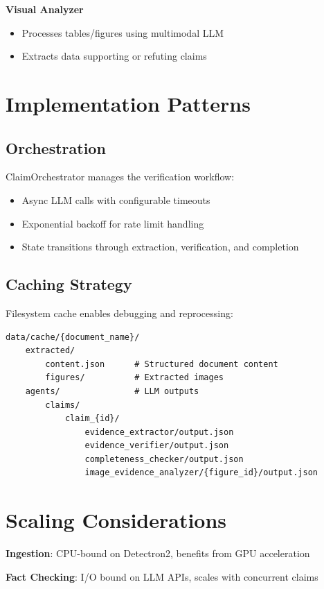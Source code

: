 \documentclass[11pt]{article}
\begin{document}
\textbf{Visual Analyzer}
\begin{itemize}
\item Processes tables/figures using multimodal LLM
\item Extracts data supporting or refuting claims
\end{itemize}

\section{Implementation Patterns}

\subsection{Orchestration}

ClaimOrchestrator manages the verification workflow:
\begin{itemize}
\item Async LLM calls with configurable timeouts
\item Exponential backoff for rate limit handling
\item State transitions through extraction, verification, and completion
\end{itemize}

\subsection{Caching Strategy}

Filesystem cache enables debugging and reprocessing:

\begin{verbatim}
data/cache/{document_name}/
    extracted/
        content.json      # Structured document content
        figures/          # Extracted images
    agents/               # LLM outputs
        claims/
            claim_{id}/
                evidence_extractor/output.json
                evidence_verifier/output.json
                completeness_checker/output.json
                image_evidence_analyzer/{figure_id}/output.json
\end{verbatim}

\section{Scaling Considerations}

\textbf{Ingestion}: CPU-bound on Detectron2, benefits from GPU acceleration

\textbf{Fact Checking}: I/O bound on LLM APIs, scales with concurrent claims
\end{document}
